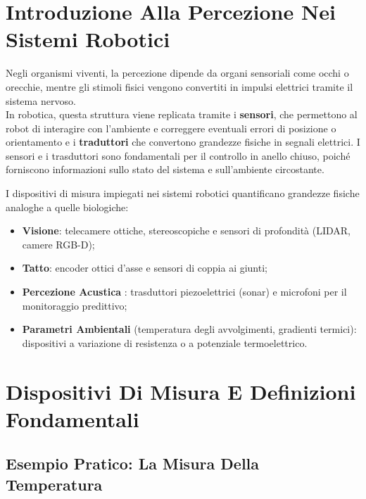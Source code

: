 ﻿\documentclass[11pt, a4paper]{article}
\author{Francesco Lo Verde}
\begin{document}
\tableofcontents

\newpage
\section{Introduzione Alla Percezione Nei Sistemi Robotici}
Negli organismi viventi, la percezione dipende da organi sensoriali come occhi o orecchie, mentre gli stimoli fisici vengono convertiti in impulsi elettrici tramite il sistema nervoso.\\
In robotica, questa struttura viene replicata tramite i \textbf{sensori}, che permettono al robot di interagire con l'ambiente e correggere eventuali errori di posizione o orientamento e i \textbf{traduttori} che convertono grandezze fisiche in segnali elettrici. I sensori e i trasduttori sono fondamentali per il controllo in anello chiuso, poiché forniscono informazioni sullo stato del sistema e sull'ambiente circostante.

I dispositivi di misura impiegati nei sistemi robotici quantificano grandezze fisiche analoghe a quelle biologiche:
\begin{itemize}
    \item \textbf{Visione}: telecamere ottiche, stereoscopiche e sensori di profondità (LIDAR, camere RGB-D);
    \item \textbf{Tatto}: encoder ottici d'asse e sensori di coppia ai giunti;
    \item \textbf{Percezione Acustica} : trasduttori piezoelettrici (sonar) e microfoni per il monitoraggio predittivo;
    \item \textbf{Parametri Ambientali} (temperatura degli avvolgimenti, gradienti termici): dispositivi a variazione di resistenza o a potenziale termoelettrico.
\end{itemize}

\section{Dispositivi Di Misura E Definizioni Fondamentali}

\subsection{Esempio Pratico: La Misura Della Temperatura}
\end{document}

